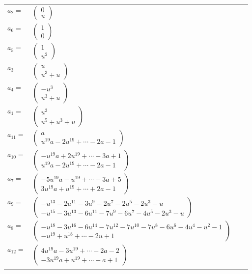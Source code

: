 \documentclass[1p]{elsarticle_modified}
\theoremstyle{definition}
\begin{document}
\begin{tabular}{m{7pt} m{180pt} m{7pt} m{180pt} }
\flushright $a_{2}=$&$\begin{pmatrix}0\\u\end{pmatrix}$ \\
\flushright $a_{6}=$&$\begin{pmatrix}1\\0\end{pmatrix}$ \\
\flushright $a_{5}=$&$\begin{pmatrix}1\\u^2\end{pmatrix}$ \\
\flushright $a_{3}=$&$\begin{pmatrix}u\\u^3+u\end{pmatrix}$ \\
\flushright $a_{4}=$&$\begin{pmatrix}- u^3\\u^3+u\end{pmatrix}$ \\
\flushright $a_{1}=$&$\begin{pmatrix}u^3\\u^5+u^3+u\end{pmatrix}$ \\
\flushright $a_{11}=$&$\begin{pmatrix}a\\u^{19} a-2 u^{19}+\cdots-2 a-1\end{pmatrix}$ \\
\flushright $a_{10}=$&$\begin{pmatrix}- u^{19} a+2 u^{19}+\cdots+3 a+1\\u^{19} a-2 u^{19}+\cdots-2 a-1\end{pmatrix}$ \\
\flushright $a_{7}=$&$\begin{pmatrix}-5 u^{19} a- u^{19}+\cdots-3 a+5\\3 u^{19} a+u^{19}+\cdots+2 a-1\end{pmatrix}$ \\
\flushright $a_{9}=$&$\begin{pmatrix}- u^{13}-2 u^{11}-3 u^9-2 u^7-2 u^5-2 u^3- u\\- u^{15}-3 u^{13}-6 u^{11}-7 u^9-6 u^7-4 u^5-2 u^3- u\end{pmatrix}$ \\
\flushright $a_{8}=$&$\begin{pmatrix}- u^{18}-3 u^{16}-6 u^{14}-7 u^{12}-7 u^{10}-7 u^8-6 u^6-4 u^4- u^2-1\\- u^{19}+u^{18}+\cdots-2 u+1\end{pmatrix}$ \\
\flushright $a_{12}=$&$\begin{pmatrix}4 u^{19} a-3 u^{19}+\cdots-2 a-2\\-3 u^{19} a+u^{19}+\cdots+a+1\end{pmatrix}$\\&\end{tabular}
\end{document}
